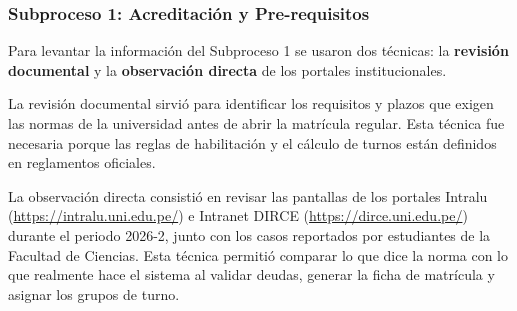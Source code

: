 \subsubsection{Subproceso 1: Acreditación y Pre-requisitos}

Para levantar la información del Subproceso 1 se usaron dos técnicas: la \textbf{revisión documental} y la \textbf{observación directa} de los portales institucionales.

La revisión documental sirvió para identificar los requisitos y plazos que exigen las normas de la universidad antes de abrir la matrícula regular. Esta técnica fue necesaria porque las reglas de habilitación y el cálculo de turnos están definidos en reglamentos oficiales.

La observación directa consistió en revisar las pantallas de los portales Intralu (\url{https://intralu.uni.edu.pe/}) e Intranet DIRCE (\url{https://dirce.uni.edu.pe/}) durante el periodo 2026-2, junto con los casos reportados por estudiantes de la Facultad de Ciencias. Esta técnica permitió comparar lo que dice la norma con lo que realmente hace el sistema al validar deudas, generar la ficha de matrícula y asignar los grupos de turno.
